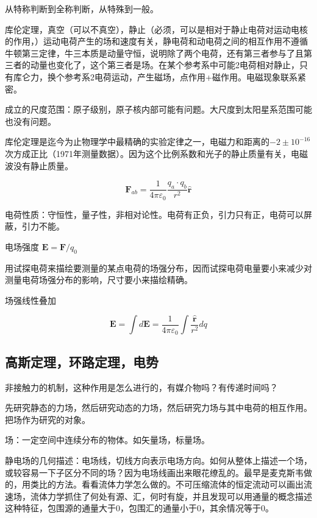 \documentclass[UTF8]{../06-Physics}
\begin{document}
从特称判断到全称判断，从特殊到一般。

库伦定理，真空（可以不真空），静止（必须，可以是相对于静止电荷对运动电核的作用，）运动电荷产生的场和速度有关，静电荷和动电荷之间的相互作用不遵循牛顿第三定律，牛三本质是动量守恒，说明除了两个电荷，还有第三者参与了且第三者的动量也变化了，这个第三者是场。在某个参考系中可能2电荷相对静止，只有库仑力，换个参考系2电荷运动，产生磁场，点作用+磁作用。电磁现象联系紧密。

成立的尺度范围：原子级别，原子核内部可能有问题。大尺度到太阳星系范围可能也没有问题。

库伦定理是迄今为止物理学中最精确的实验定律之一，电磁力和距离的$-2 \pm 10^{-16}$次方成正比（1971年测量数据）。因为这个比例系数和光子的静止质量有关，电磁波没有静止质量。

\begin{displaymath}
    \boldsymbol F_{ab} = \frac{1}{4 \pi \varepsilon _0} \frac{q_a \cdot q_b}{r^2} \boldsymbol {\hat{r} } 
\end{displaymath}

电荷性质：守恒性，量子性，非相对论性。电荷有正负，引力只有正，电荷可以屏蔽，引力不能。

电场强度 $\boldsymbol E = \boldsymbol F / q_0$

用试探电荷来描绘要测量的某点电荷的场强分布，因而试探电荷电量要小来减少对测量电荷场强分布的影响，尺寸要小来描绘精确。

场强线性叠加 

$$\boldsymbol E =  \int d \boldsymbol E
= \frac{1}{4 \pi \varepsilon _0} \int \frac{\boldsymbol {\hat{r} } }{r^2} dq $$

\subsection{高斯定理，环路定理，电势}

非接触力的机制，这种作用是怎么进行的，有媒介物吗？有传递时间吗？

先研究静态的力场，然后研究动态的力场，然后研究力场与其中电荷的相互作用。把场作为研究的对象。

场：一定空间中连续分布的物体。如矢量场，标量场。

静电场的几何描述：电场线，切线方向表示电场方向。如何从整体上描述一个场，或较容易一下子区分不同的场？因为电场线画出来眼花缭乱的。最早是麦克斯韦做的，用类比的方法。看看流体力学怎么做的。不可压缩流体的恒定流动可以画出流速场，流体力学抓住了何处有源、汇，何时有旋，并且发现可以用通量的概念描述这种特征，包围源的通量大于0，包围汇的通量小于0，其余情况等于0。
\end{document}
